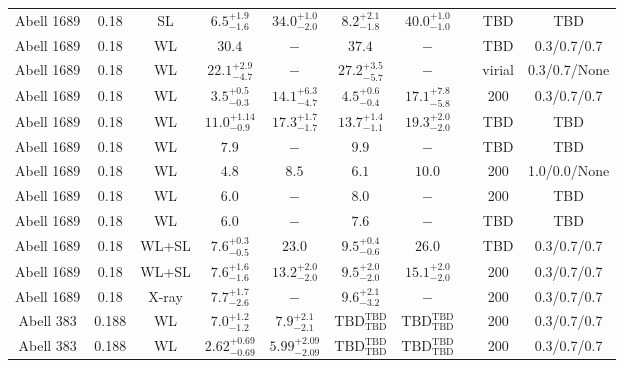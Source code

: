 \begin{table}
\begin{tabular}{cccccccccc}
Abell 1689 & 0.18 & SL & ${6.5}^{+1.9}_{-1.6}$ & ${34.0}^{+1.0}_{-2.0}$ & ${8.2}^{+2.1}_{-1.8}$ & ${40.0}^{+1.0}_{-1.0}$ & \citet{BR05.1} & TBD & TBD \\
Abell 1689 & 0.18 & WL & ${30.4}^{}_{}$ & ${-}^{}_{}$ & ${37.4}^{}_{}$ & ${-}^{}_{}$ & \citet{HA06.1} & TBD & 0.3/0.7/0.7 \\
Abell 1689 & 0.18 & WL & ${22.1}^{+2.9}_{-4.7}$ & ${-}^{}_{}$ & ${27.2}^{+3.5}_{-5.7}$ & ${-}^{}_{}$ & \citet{ME06.1} & virial & 0.3/0.7/None \\
Abell 1689 & 0.18 & WL & ${3.5}^{+0.5}_{-0.3}$ & ${14.1}^{+6.3}_{-4.7}$ & ${4.5}^{+0.6}_{-0.4}$ & ${17.1}^{+7.8}_{-5.8}$ & \citet{BA05.1} & 200 & 0.3/0.7/0.7 \\
Abell 1689 & 0.18 & WL & ${11.0}^{+1.14}_{-0.9}$ & ${17.3}^{+1.7}_{-1.7}$ & ${13.7}^{+1.4}_{-1.1}$ & ${19.3}^{+2.0}_{-2.0}$ & \citet{BR05.2} & TBD & TBD \\
Abell 1689 & 0.18 & WL & ${7.9}^{}_{}$ & ${-}^{}_{}$ & ${9.9}^{}_{}$ & ${-}^{}_{}$ & \citet{CL03.1} & TBD & TBD \\
Abell 1689 & 0.18 & WL & ${4.8}^{}_{}$ & ${8.5}^{}_{}$ & ${6.1}^{}_{}$ & ${10.0}^{}_{}$ & \citet{KI02.1} & 200 & 1.0/0.0/None \\
Abell 1689 & 0.18 & WL & ${6.0}^{}_{}$ & ${-}^{}_{}$ & ${8.0}^{}_{}$ & ${-}^{}_{}$ & \citet{CL01.2} & 200 & TBD \\
Abell 1689 & 0.18 & WL & ${6.0}^{}_{}$ & ${-}^{}_{}$ & ${7.6}^{}_{}$ & ${-}^{}_{}$ & \citet{CL01.1} & TBD & TBD \\
Abell 1689 & 0.18 & WL+SL & ${7.6}^{+0.3}_{-0.5}$ & ${23.0}^{}_{}$ & ${9.5}^{+0.4}_{-0.6}$ & ${26.0}^{}_{}$ & \citet{HA06.1} & TBD & 0.3/0.7/0.7 \\
Abell 1689 & 0.18 & WL+SL & ${7.6}^{+1.6}_{-1.6}$ & ${13.2}^{+2.0}_{-2.0}$ & ${9.5}^{+2.0}_{-2.0}$ & ${15.1}^{+2.0}_{-2.0}$ & \citet{LI06.1} & 200 & 0.3/0.7/0.7 \\
Abell 1689 & 0.18 & X-ray & ${7.7}^{+1.7}_{-2.6}$ & ${-}^{}_{}$ & ${9.6}^{+2.1}_{-3.2}$ & ${-}^{}_{}$ & \citet{AN04.1} & 200 & 0.3/0.7/0.7 \\
Abell 383 & 0.188 & WL & ${7.0}^{+1.2}_{-1.2}$ & ${7.9}^{+2.1}_{-2.1}$ & ${\mathrm{TBD}}^{\mathrm{TBD}}_{\mathrm{TBD}}$ & ${\mathrm{TBD}}^{\mathrm{TBD}}_{\mathrm{TBD}}$ & \citet{SE14.1} & 200 & 0.3/0.7/0.7 \\
Abell 383 & 0.188 & WL & ${2.62}^{+0.69}_{-0.69}$ & ${5.99}^{+2.09}_{-2.09}$ & ${\mathrm{TBD}}^{\mathrm{TBD}}_{\mathrm{TBD}}$ & ${\mathrm{TBD}}^{\mathrm{TBD}}_{\mathrm{TBD}}$ & \citet{BA07.1} & 200 & 0.3/0.7/0.7 \\

\end{tabular}
\end{table}
